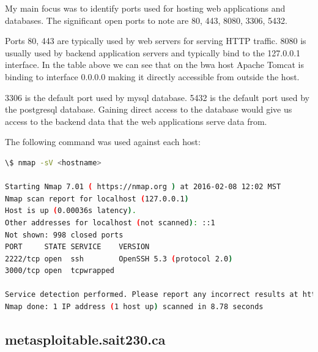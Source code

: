 \documentclass{article}
\begin{document}

My main focus was to identify ports used for hosting web applications and databases. 
The significant open ports to note are 80, 443, 8080, 3306, 5432.

Ports 80, 443 are typically used by web servers for serving HTTP traffic.
8080 is usually used by backend application servers and typically bind to the 127.0.0.1
interface. In the table above we can see that on the bwa host Apache Tomcat is binding 
to interface 0.0.0.0 making it directly accessible from outside the host.

3306 is the default port used by mysql database.
5432 is the default port used by the postgresql database.
Gaining direct access to the database would give us access to the backend data
that the web applications serve data from.

\noindent The following command was used against each host:
\begin{lstlisting}[language=bash, firstline=1, lastline=3]
\$ nmap -sV <hostname>

Starting Nmap 7.01 ( https://nmap.org ) at 2016-02-08 12:02 MST
Nmap scan report for localhost (127.0.0.1)
Host is up (0.00036s latency).
Other addresses for localhost (not scanned): ::1
Not shown: 998 closed ports
PORT     STATE SERVICE    VERSION
2222/tcp open  ssh        OpenSSH 5.3 (protocol 2.0)
3000/tcp open  tcpwrapped

Service detection performed. Please report any incorrect results at https://nmap.org/submit/ .
Nmap done: 1 IP address (1 host up) scanned in 8.78 seconds
\end{lstlisting}

\subsection{metasploitable.sait230.ca}
\end{document}

